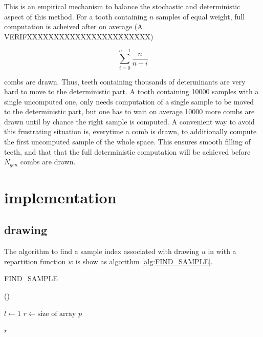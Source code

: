 \documentclass[./thesis.tex]{subfiles}
\begin{document}
This is an empirical mechanism to balance the stochastic and deterministic aspect of this method. For a tooth containing $n$ samples of equal weight, full computation is acheived after on average (A VERIFXXXXXXXXXXXXXXXXXXXXXXX)

$$\sum_{i=0}^{n-1} \frac{n}{n-i}$$

combs are drawn. Thus, teeth containing thousands of determinants are very hard to move to the deterministic part. A tooth containing 10000 samples with a single uncomputed one, only needs computation of a single sample to be moved to the deterministic part, but one has to wait on average 10000 more combs are drawn until by chance the right sample is computed.
A convenient way to avoid this frustrating situation is, everytime a comb is drawn, to additionally compute the first uncomputed sample of the whole space. This ensures smooth filling of teeth, and that that the full deterministic computation will be achieved before $N_{gen}$ combs are drawn.

\section{implementation}



\subsection{drawing}

The algorithm to find a sample index associated with drawing $u$ in with a repartition function $w$ is show as algorithm \ref{alg:FIND_SAMPLE}.

\begin{algorithm}
\label{alg:FIND_SAMPLE}
\caption{FIND\_SAMPLE}
	
	\Fn(){}{
		$l \gets 1$ \;
		$r \gets \text{size of array } p$ \;
		
		\KwRet $r$ \;
	}
\end{algorithm}
\end{document}
